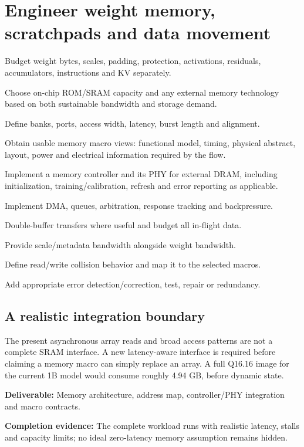 \documentclass[11pt,a4paper]{article}
\newcommand{\phase}[2]{\clearpage\section{#1}\label{#2}}
\newcommand{\deliver}[2]{\begin{tcolorbox}[colback=pale,colframe=line,boxrule=0.5pt,arc=1mm,left=8pt,right=8pt,top=6pt,bottom=6pt]\textbf{Deliverable:} #1\par\textbf{Completion evidence:} #2\end{tcolorbox}}
\begin{document}
\phase{Engineer weight memory, scratchpads and data movement}{sec:memory}
\begin{checklist}
\item Budget weight bytes, scales, padding, protection, activations, residuals,
accumulators, instructions and KV separately.
\item Choose on-chip ROM/SRAM capacity and any external memory technology based on
both sustainable bandwidth and storage demand.
\item Define banks, ports, access width, latency, burst length and alignment.
\item Obtain usable memory macro views: functional model, timing, physical abstract,
layout, power and electrical information required by the flow.
\item Implement a memory controller and its PHY for external DRAM, including
initialization, training/calibration, refresh and error reporting as applicable.
\item Implement DMA, queues, arbitration, response tracking and backpressure.
\item Double-buffer transfers where useful and budget all in-flight data.
\item Provide scale/metadata bandwidth alongside weight bandwidth.
\item Define read/write collision behavior and map it to the selected macros.
\item Add appropriate error detection/correction, test, repair or redundancy.
\end{checklist}
\subsection*{A realistic integration boundary}
\begin{center}
\end{center}
The present asynchronous array reads and broad access patterns are not a
complete SRAM interface. A new latency-aware interface is required before
claiming a memory macro can simply replace an array. A full Q16.16 image for
the current 1B model would consume roughly 4.94 GB, before dynamic state.
\deliver{Memory architecture, address map, controller/PHY integration and macro
contracts.}{The complete workload runs with realistic latency, stalls and
capacity limits; no ideal zero-latency memory assumption remains hidden.}
\end{document}
